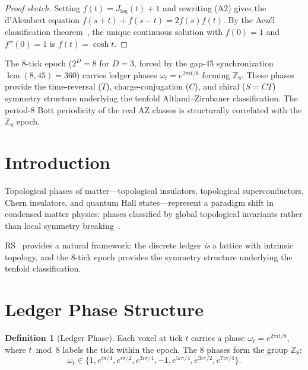 \documentclass[12pt,a4paper]{article}
\theoremstyle{definition}
\newtheorem{definition}[theorem]{Definition}
\theoremstyle{remark}
\begin{document}
\begin{proof}[Proof sketch]
Setting $f(t) = J_{\log}(t) + 1$ and rewriting \textup{(A2)} gives the
d'Alembert equation $f(s+t) + f(s-t) = 2f(s)f(t)$.  By the Acz\'el
classification theorem~\cite{Aczel1966}, the unique continuous solution
with $f(0) = 1$ and $f''(0) = 1$ is $f(t) = \cosh t$.
\end{proof}

\noindent The 8-tick epoch ($2^D = 8$ for $D = 3$, forced by the
gap-45 synchronization $\operatorname{lcm}(8,45) = 360$) carries
ledger phases $\omega_t = e^{2\pi it/8}$ forming $\mathbb{Z}_8$.
These phases provide the time-reversal ($T$), charge-conjugation ($C$),
and chiral ($S = CT$) symmetry structure underlying the tenfold
Altland--Zirnbauer classification.  The period-8 Bott periodicity of
the real AZ classes is structurally correlated with the $\mathbb{Z}_8$
epoch.

\section{Introduction}
\label{sec:intro}

Topological phases of matter---topological insulators, topological
superconductors, Chern insulators, and quantum Hall
states---represent a paradigm shift in condensed matter physics:
phases classified by global topological invariants rather than local
symmetry breaking~\cite{Hasan2010}.

RS~\cite{RS_Axioms} provides a natural framework: the discrete ledger
\emph{is} a lattice with intrinsic topology, and the 8-tick epoch
provides the symmetry structure underlying the tenfold
classification.

\section{Ledger Phase Structure}
\label{sec:phase}

\begin{definition}[Ledger Phase]
Each voxel at tick $t$ carries a phase $\omega_t = e^{2\pi i t/8}$,
where $t \bmod 8$ labels the tick within the epoch.  The 8 phases
form the group $\mathbb{Z}_8$:
\begin{equation}
  \omega_t \in \{1, e^{i\pi/4}, e^{i\pi/2}, e^{3i\pi/4},
  -1, e^{5i\pi/4}, e^{3i\pi/2}, e^{7i\pi/4}\}.
\end{equation}
\end{definition}
\end{document}
